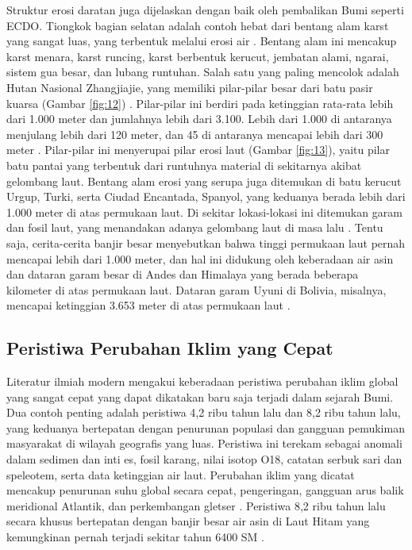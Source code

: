 \documentclass[10pt,twocolumn,letterpaper]{article}
\begin{document}
Struktur erosi daratan juga dijelaskan dengan baik oleh pembalikan Bumi seperti ECDO. Tiongkok bagian selatan adalah contoh hebat dari bentang alam karst yang sangat luas, yang terbentuk melalui erosi air \cite{82}. Bentang alam ini mencakup karst menara, karst runcing, karst berbentuk kerucut, jembatan alami, ngarai, sistem gua besar, dan lubang runtuhan. Salah satu yang paling mencolok adalah Hutan Nasional Zhangjiajie, yang memiliki pilar-pilar besar dari batu pasir kuarsa (Gambar \ref{fig:12}) \cite{84}. Pilar-pilar ini berdiri pada ketinggian rata-rata lebih dari 1.000 meter dan jumlahnya lebih dari 3.100. Lebih dari 1.000 di antaranya menjulang lebih dari 120 meter, dan 45 di antaranya mencapai lebih dari 300 meter \cite{85}. Pilar-pilar ini menyerupai pilar erosi laut (Gambar \ref{fig:13}), yaitu pilar batu pantai yang terbentuk dari runtuhnya material di sekitarnya akibat gelombang laut. Bentang alam erosi yang serupa juga ditemukan di batu kerucut Urgup, Turki, serta Ciudad Encantada, Spanyol, yang keduanya berada lebih dari 1.000 meter di atas permukaan laut. Di sekitar lokasi-lokasi ini ditemukan garam dan fosil laut, yang menandakan adanya gelombang laut di masa lalu \cite{15,86,87}. Tentu saja, cerita-cerita banjir besar \cite{3} menyebutkan bahwa tinggi permukaan laut pernah mencapai lebih dari 1.000 meter, dan hal ini didukung oleh keberadaan air asin dan dataran garam besar di Andes dan Himalaya yang berada beberapa kilometer di atas permukaan laut. Dataran garam Uyuni di Bolivia, misalnya, mencapai ketinggian 3.653 meter di atas permukaan laut \cite{94}.


\subsection{Peristiwa Perubahan Iklim yang Cepat}

Literatur ilmiah modern mengakui keberadaan peristiwa perubahan iklim global yang sangat cepat yang dapat dikatakan baru saja terjadi dalam sejarah Bumi. Dua contoh penting adalah peristiwa 4,2 ribu tahun lalu dan 8,2 ribu tahun lalu, yang keduanya bertepatan dengan penurunan populasi dan gangguan pemukiman masyarakat di wilayah geografis yang luas. Peristiwa ini terekam sebagai anomali dalam sedimen dan inti es, fosil karang, nilai isotop O18, catatan serbuk sari dan speleotem, serta data ketinggian air laut. Perubahan iklim yang dicatat mencakup penurunan suhu global secara cepat, pengeringan, gangguan arus balik meridional Atlantik, dan perkembangan gletser \cite{90,91,92}. Peristiwa 8,2 ribu tahun lalu secara khusus bertepatan dengan banjir besar air asin di Laut Hitam yang kemungkinan pernah terjadi sekitar tahun 6400 SM \cite{93}.
\end{document}
